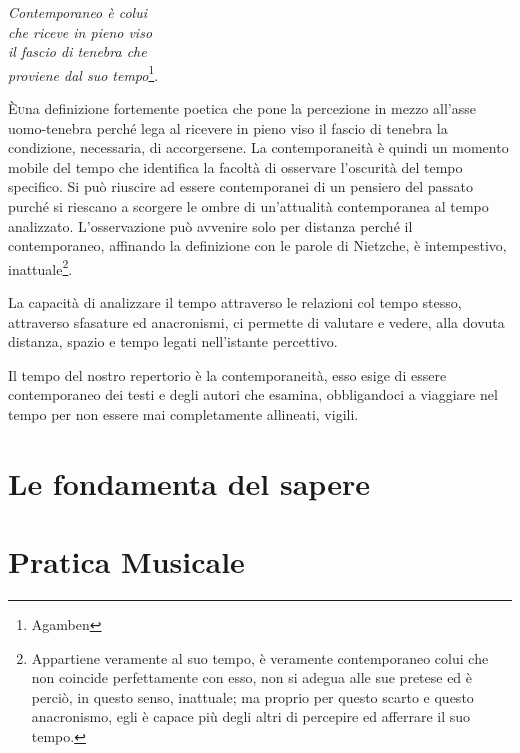 \documentclass[
	10pt,
	a4paper,
	twocolumn
	]{article}
\begin{document}
\begin{flushright}
\textit{
Contemporaneo è colui \\
che riceve in pieno viso \\
il fascio di tenebra che \\
proviene dal suo tempo}\footnote{Agamben}.
\end{flushright}


\lettrine[nindent=0em,lines=3]{È} una definizione fortemente poetica che pone la percezione in mezzo all'asse uomo-tenebra perché lega al ricevere in pieno viso il fascio di tenebra la condizione, necessaria, di accorgersene. La contemporaneità è quindi un momento mobile del tempo che identifica la facoltà di osservare l'oscurità del tempo specifico. Si può riuscire ad essere contemporanei di un pensiero del passato purché si riescano a scorgere le ombre di un'attualità contemporanea al tempo analizzato. L'osservazione può avvenire solo per distanza perché il contemporaneo, affinando la definizione con le parole di Nietzche, è intempestivo, inattuale\footnote{Appartiene veramente al suo tempo, è veramente contemporaneo colui che non coincide perfettamente con esso, non si adegua alle sue pretese ed è perciò, in questo senso, inattuale; ma proprio per questo scarto e questo anacronismo, egli è capace pi\`u degli altri di percepire ed afferrare il suo tempo.}.

La capacità di analizzare il tempo attraverso le relazioni col tempo stesso, attraverso sfasature ed anacronismi, ci permette di valutare e vedere, alla dovuta distanza, spazio e tempo legati nell'istante percettivo.

Il tempo del nostro repertorio è la contemporaneità, esso esige di essere contemporaneo dei testi e degli autori che esamina, obbligandoci a viaggiare nel tempo per non essere mai completamente allineati, vigili.

\section{Le fondamenta del sapere}

\section{Pratica Musicale}
\end{document}
